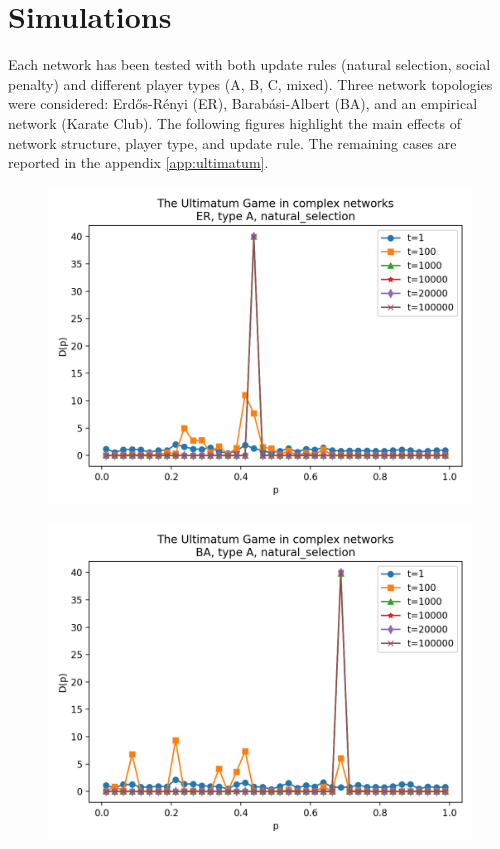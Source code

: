 \section{Simulations}
Each network has been tested with both update rules (natural selection, social
penalty) and different player types (A, B, C, mixed). Three network topologies
were considered: Erdős-Rényi (ER), Barabási-Albert (BA), and an empirical
network (Karate Club).  
The following figures highlight the main effects of network structure, player
type, and update rule. The remaining cases are reported in the appendix \ref{app:ultimatum}.

\begin{figure}[h!]
    \centering
    \setlength{\tabcolsep}{2pt}
    \begin{minipage}[t]{0.48\textwidth}
        \centering
        \includegraphics[width=\textwidth]{images/TASK1/Dp_ER_A_natural_selection.png}
        \label{fig:ER_Dp}
    \end{minipage}
    \hfill
    \begin{minipage}[t]{0.48\textwidth}
        \centering
        \includegraphics[width=\textwidth]{images/TASK1/Dp_BA_A_natural_selection.png}

\end{minipage}
\end{figure}
